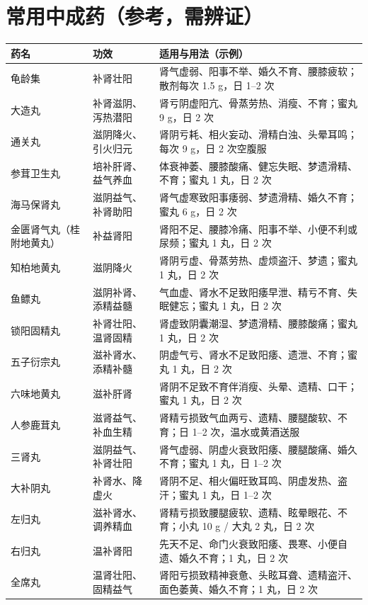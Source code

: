 \documentclass[12pt,UTF8,openany]{ctexbook}
\begin{document}
\section{常用中成药（参考，需辨证）}

\begin{center}
\renewcommand{\arraystretch}{1.3}
\small
\begin{tabularx}{\textwidth}{|X|X|X|}
\hline
\textbf{药名} & \textbf{功效} & \textbf{适用与用法（示例）} \\
\hline
龟龄集 & 补肾壮阳 & 肾气虚弱、阳事不举、婚久不育、腰膝疲软；散剂每次 1.5 g，日 1–2 次 \\
\hline
大造丸 & 补肾滋阴、泻热潜阳 & 肾亏阴虚阳亢、骨蒸劳热、消瘦、不育；蜜丸 9 g，日 2 次 \\
\hline
通关丸 & 滋阴降火、引火归元 & 肾阴亏耗、相火妄动、滑精白浊、头晕耳鸣；每次 9 g，日 2 次空腹服 \\
\hline
参茸卫生丸 & 培补肝肾、益气养血 & 体衰神萎、腰膝酸痛、健忘失眠、梦遗滑精、不育；蜜丸 1 丸，日 2 次 \\
\hline
海马保肾丸 & 滋阴益气、补肾助阳 & 肾气虚寒致阳事痿弱、梦遗滑精、婚久不育；蜜丸 6 g，日 2 次 \\
\hline
金匮肾气丸（桂附地黄丸） & 补益肾阳 & 肾阳不足、腰膝冷痛、阳事不举、小便不利或尿频；蜜丸 1 丸，日 2 次 \\
\hline
知柏地黄丸 & 滋阴降火 & 肾阴亏虚、骨蒸劳热、虚烦盗汗、梦遗；蜜丸 1 丸，日 2 次 \\
\hline
鱼鳔丸 & 滋阴补肾、添精益髓 & 气血虚、肾水不足致阳痿早泄、精亏不育、失眠健忘；蜜丸 1 丸，日 2 次 \\
\hline
锁阳固精丸 & 补肾壮阳、温肾固精 & 肾虚致阴囊潮湿、梦遗滑精、腰膝酸痛；蜜丸 1 丸，日 2 次 \\
\hline
五子衍宗丸 & 滋补肾水、添精补髓 & 阴虚气亏、肾水不足致阳痿、遗泄、不育；蜜丸 1 丸，日 2 次 \\
\hline
六味地黄丸 & 滋补肝肾 & 肾阴不足致不育伴消瘦、头晕、遗精、口干；蜜丸 1 丸，日 2 次 \\
\hline
人参鹿茸丸 & 滋肾益气、补血生精 & 肾精亏损致气血两亏、遗精、腰腿酸软、不育；日 1–2 次，温水或黄酒送服 \\
\hline
三肾丸 & 滋阴益气、补肾壮阳 & 肾气虚弱、阴虚火衰致阳痿、腰腿酸痛、婚久不育；蜜丸 1 丸，日 1–2 次 \\
\hline
大补阴丸 & 补肾水、降虚火 & 肾阴不足、相火偏旺致耳鸣、阴虚发热、盗汗；蜜丸 1 丸，日 1–2 次 \\
\hline
左归丸 & 滋补肾水、调养精血 & 肾精亏损致腰腿疲软、遗精、眩晕眼花、不育；小丸 10 g / 大丸 2 丸，日 2 次 \\
\hline
右归丸 & 温补肾阳 & 先天不足、命门火衰致阳痿、畏寒、小便自遗、婚久不育；1 丸，日 2 次 \\
\hline
全席丸 & 温肾壮阳、固精益气 & 肾阳亏损致精神衰惫、头眩耳聋、遗精盗汗、面色萎黄、婚久不育；1 丸，日 2 次 \\
\hline
\end{tabularx}
\end{center}
\end{document}
